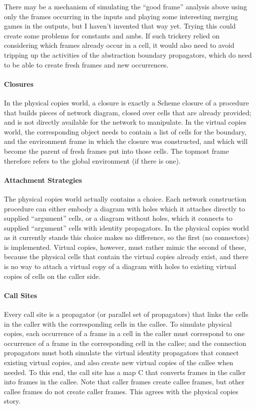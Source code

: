 \documentclass{article}
\begin{document}
There may be a mechanism of simulating the ``good frame'' analysis
above using only the frames occurring in the inputs and playing
some interesting merging games in the outputs, but I haven't
invented that way yet.  Trying this could create some problems for
constants and ambs.  If such trickery relied on considering which
frames already occur in a cell, it would also need to avoid
tripping up the activities of the abstraction boundary
propagators, which do need to be able to create fresh frames and new occurrences.

\paragraph{Closures}
In the physical copies world, a closure is exactly a Scheme
closure of a procedure that builds pieces of network diagram,
closed over cells that are already provided; and is not directly
available for the network to manipulate.  In the virtual copies
world, the corresponding object needs to contain a list of cells
for the boundary, and the environment frame in which the closure
was constructed, and which will become the parent of fresh frames
put into those cells.  The topmost frame therefore refers to the
global environment (if there is one).

\paragraph{Attachment Strategies}
The physical copies world actually contains a choice.  Each
network construction procedure can either embody a diagram with
holes which it attaches directly to supplied ``argument'' cells, or
a diagram without holes, which it connects to supplied ``argument''
cells with identity propagators.  In the physical copies world as
it currently stands this choice makes no difference, so the first
(no connectors) is implemented.  Virtual copies, however, must
rather mimic the second of these, because the physical cells that
contain the virtual copies already exist, and there is no way to
attach a virtual copy of a diagram with holes to existing virtual
copies of cells on the caller side.

\paragraph{Call Sites}
Every call site is a propagator (or parallel set of propagators)
that links the cells in the caller with the corresponding cells in
the callee.  To simulate physical copies, each occurrence of a
frame in a cell in the caller must correspond to one occurrence of
a frame in the corresponding cell in the callee; and the
connection propagators must both simulate the virtual identity
propagators that connect existing virtual copies, and also create
new virtual copies of the callee when needed.  To this end, the
call site has a map C that converts frames in the caller into
frames in the callee.  Note that caller frames create callee
frames, but other callee frames do not create caller frames.  This
agrees with the physical copies story.
\end{document}
